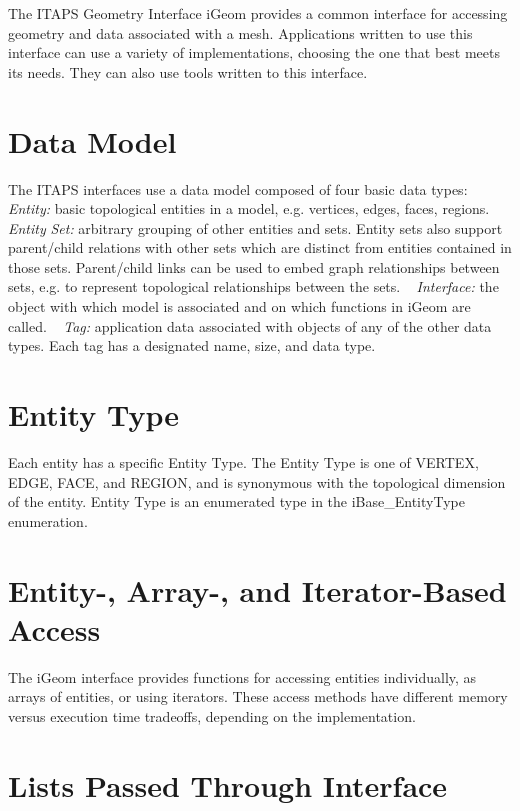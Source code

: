The I\+T\+A\+PS Geometry Interface i\+Geom provides a common interface for accessing geometry and data associated with a mesh. Applications written to use this interface can use a variety of implementations, choosing the one that best meets its needs. They can also use tools written to this interface.\hypertarget{index_ITAPS}{}\section{Data Model}\label{index_ITAPS}
The I\+T\+A\+PS interfaces use a data model composed of four basic data types\+:~\newline
{\itshape Entity\+:} basic topological entities in a model, e.\+g. vertices, edges, faces, regions. ~\newline
{\itshape Entity} {\itshape Set\+:} arbitrary grouping of other entities and sets. Entity sets also support parent/child relations with other sets which are distinct from entities contained in those sets. Parent/child links can be used to embed graph relationships between sets, e.\+g. to represent topological relationships between the sets. ~\newline
{\itshape Interface\+:} the object with which model is associated and on which functions in i\+Geom are called. ~\newline
{\itshape Tag\+:} application data associated with objects of any of the other data types. Each tag has a designated name, size, and data type.\hypertarget{index_JTAPS}{}\section{Entity Type}\label{index_JTAPS}
Each entity has a specific Entity Type. The Entity Type is one of V\+E\+R\+T\+EX, E\+D\+GE, F\+A\+CE, and R\+E\+G\+I\+ON, and is synonymous with the topological dimension of the entity. Entity Type is an enumerated type in the i\+Base\+\_\+\+Entity\+Type enumeration.\hypertarget{index_KTAPS}{}\section{Entity-\/, Array-\/, and Iterator-\/\+Based Access}\label{index_KTAPS}
The i\+Geom interface provides functions for accessing entities individually, as arrays of entities, or using iterators. These access methods have different memory versus execution time tradeoffs, depending on the implementation.\hypertarget{index_LTAPS}{}\section{Lists Passed Through Interface}\label{index_LTAPS}
